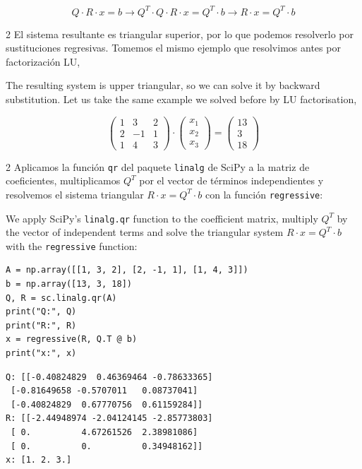 \begin{equation*}
Q\cdot R\cdot x =b \rightarrow Q^T\cdot Q\cdot R\cdot x = Q^T \cdot b \rightarrow R\cdot x= Q^T\cdot b
\end{equation*}

\begin{paracol}{2}
El sistema resultante es triangular superior, por lo que podemos resolverlo por sustituciones regresivas. Tomemos el mismo ejemplo que resolvimos antes por factorización LU,

\switchcolumn

The resulting system is upper triangular, so we can solve it by backward substitution. Let us take the same example we solved before by LU factorisation,
\end{paracol}
\begin{equation*}
\begin{pmatrix}
1& 3& 2\\
2& -1& 1\\
1& 4& 3
\end{pmatrix}\cdot \begin{pmatrix}
x_1\\
x_2\\
x_3
\end{pmatrix}=\begin{pmatrix}
13\\
3\\
18
\end{pmatrix}
\end{equation*}

\begin{paracol}{2}
Aplicamos la función \texttt{qr} del paquete \texttt{linalg} de SciPy a la matriz de coeficientes, multiplicamos $Q^T$ por el vector de términos independientes y resolvemos el sistema triangular $R \cdot x = Q^T \cdot b$ con la función \texttt{regressive}:

\switchcolumn
We apply SciPy's \texttt{linalg.qr} function to the coefficient matrix, multiply $Q^T$ by the vector of independent terms and solve the triangular system $R\cdot x = Q^T \cdot b$ with the \texttt{regressive} function:
\end{paracol}
\begin{verbatim}
A = np.array([[1, 3, 2], [2, -1, 1], [1, 4, 3]])
b = np.array([13, 3, 18])
Q, R = sc.linalg.qr(A)
print("Q:", Q)
print("R:", R)
x = regressive(R, Q.T @ b)
print("x:", x)
\end{verbatim}

\begin{verbatim}
Q: [[-0.40824829  0.46369464 -0.78633365]
 [-0.81649658 -0.5707011   0.08737041]
 [-0.40824829  0.67770756  0.61159284]]
R: [[-2.44948974 -2.04124145 -2.85773803]
 [ 0.          4.67261526  2.38981086]
 [ 0.          0.          0.34948162]]
x: [1. 2. 3.]
\end{verbatim}

